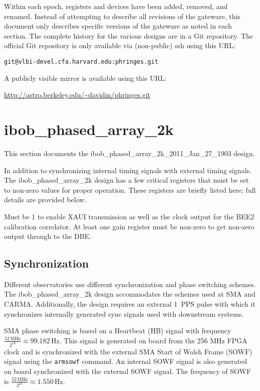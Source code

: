 \documentclass[12pt]{article}
\begin{document}
Within each epoch, registers and devices have been added, removed, and renamed.
Instead of attempting to describe all revisions of the gateware, this document
only describes specific versions of the gateware as noted in each section.  The
complete history for the various designs are in a Git repository.  The official
Git repository is only available via (non-public) ssh using this URL:

\begin{center}
\nolinkurl{git@vlbi-devel.cfa.harvard.edu:phringes.git}
\end{center}

A publicly visible mirror is available using this URL:

\begin{center}
\url{http://astro.berkeley.edu/~davidm/phringes.git}
\end{center}

\section{ibob\_phased\_array\_2k}

This section documents the ibob\_phased\_array\_2k\_2011\_Jan\_27\_1903 design.

In addition to synchronizing internal timing signals with external timing
signals.  The ibob\_phased\_array\_2k design has a few critical registers that
must be set to non-zero values for proper operation.  These registers are
briefly listed here; full details are provided below.

\begin{description}
 Must be 1 to enable XAUI transmission as well as the clock
output for the BEE2 calibration correlator.
 At least one gain register must be non-zero to get
non-zero output through to the DBE.
\end{description}

  \subsection{Synchronization}

Different observatories use different synchronization and phase switching
schemes.  The ibob\_phased\_array\_2k design accommodates the schemes used at
SMA and CARMA.  Additionally, the design requires an external 1~PPS pulse with
which it synchronizes internally generated sync signals used with downstream
systems.

SMA phase switching is based on a Heartbeat (HB) signal with frequency
$\frac{52 \, \mathrm{MHz}}{2^{19}} \approx 99.182 \, \mathrm{Hz}$.  This signal
is generated on board from the 256 MHz FPGA clock and is synchronized with the
external SMA Start of Walsh Frame (SOWF) signal using the \verb|armsowf|
command.  An internal SOWF signal is also generated on board synchronized with
the external SOWF signal.  The frequency of SOWF is $\frac{52 \,
\mathrm{MHz}}{2^{25}} \approx 1.550 \, \mathrm{Hz}$.
\end{document}
